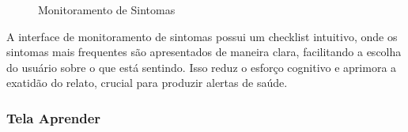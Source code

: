 \documentclass[a4paper, 12pt]{article}
\begin{document}
\begin{figure}[H]
  \centering
  \caption{Monitoramento de Sintomas}
  \label{fig:sintomas}
\end{figure}

A interface de monitoramento de sintomas possui um checklist intuitivo, onde os sintomas mais frequentes são apresentados de maneira clara, facilitando a escolha do usuário sobre o que está sentindo.  Isso reduz o esforço cognitivo e aprimora a exatidão do relato, crucial para produzir alertas de saúde.

\subsubsection{Tela Aprender}
\end{document}
